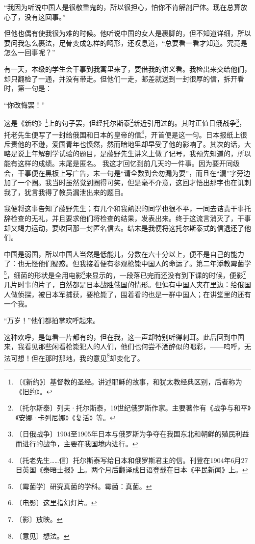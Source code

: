 \documentclass[12pt,UTF-8,openany]{ctexbook}
\begin{document}
\begin{normalsize}
    “我因为听说中国人是很敬重鬼的，所以很担心，怕你不肯解剖尸体。现在总算放心了，没有这回事。”
    
    但他也偶有使我很为难的时候。他听说中国的女人是裹脚的，但不知道详细，所以要问我怎么裹法，足骨变成怎样的畸形，还叹息道，“总要看一看才知道。究竟是怎么一回事呢？”
    
    有一天，本级的学生会干事到我寓里来了，要借我的讲义看。我检出来交给他们，却只翻检了一通，并没有带走。但他们一走，邮差就送到一封很厚的信，拆开看时，第一句是：
    
    “你改悔罢！”
    
    这是《新约》\footnote{〔《新约》〕基督教的圣经。讲述耶稣的故事，和犹太教经典区别，后者称为《旧约》。}上的句子罢，但经托尔斯泰\footnote{〔托尔斯泰〕列夫·托尔斯泰，19世纪俄罗斯作家。主要著作有《战争与和平》《安娜·卡列尼娜》《复活》等。}新近引用过的。其时正值日俄战争\footnote{〔日俄战争〕1904至1905年日本与俄罗斯为争夺在我国东北和朝鲜的殖民利益而进行的战争，主要在我国境内进行。}，托老先生便写了一封给俄国和日本的皇帝的信\footnote{〔托老先生……信〕托尔斯泰写给日本和俄罗斯君主的信。刊登在1904年6月27日英国《泰晤士报》上。两个月后翻译成日语登载在日本《平民新闻》上。}，开首便是这一句。日本报纸上很斥责他的不逊，爱国青年也愤然，然而暗地里却早受了他的影响了。其次的话，大略是说上年解剖学试验的题目，是藤野先生讲义上做了记号，我预先知道的，所以能有这样的成绩。末尾是匿名。 我这才回忆到前几天的一件事。因为要开同级会，干事便在黑板上写广告，末一句是“请全数到会勿漏为要”，而且在“漏”字旁边加了一个圈。我当时虽然觉到圈得可笑，但是毫不介意，这回才悟出那字也在讥刺我了，犹言我得了教员漏泄出来的题目。
    
    我便将这事告知了藤野先生；有几个和我熟识的同学也很不平，一同去诘责干事托辞检查的无礼，并且要求他们将检查的结果，发表出来。终于这流言消灭了，干事却又竭力运动，要收回那一封匿名信去。结末是我便将这托尔斯泰式的信退还了他们。
    
    中国是弱国，所以中国人当然是低能儿，分数在六十分以上，便不是自己的能力了：也无怪他们疑惑。但我接着便有参观枪毙中国人的命运了。第二年添教霉菌学\footnote{〔霉菌学〕研究真菌的学科。霉菌：真菌。}，细菌的形状是全用电影\footnote{〔电影〕这里指幻灯片。}来显示的，一段落已完而还没有到下课的时候，便影\footnote{〔影〕放映。}几片时事的片子，自然都是日本战胜俄国的情形。但偏有中国人夹在里边：给俄国人做侦探，被日本军捕获，要枪毙了，围着看的也是一群中国人；在讲堂里的还有一个我。
    
    “万岁！”他们都拍掌欢呼起来。
    
    这种欢呼，是每看一片都有的，但在我，这一声却特别听得刺耳。此后回到中国来，我看见那些闲看枪毙犯人的人们，他们也何尝不酒醉似的喝彩，——呜呼，无法可想！但在那时那地，我的意见\footnote{〔意见〕想法。}却变化了。
    

\end{normalsize}
\end{document}
